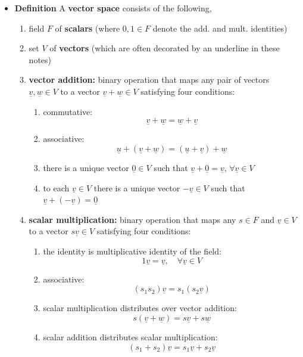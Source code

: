 \documentclass[11pt,twoside]{report}
\newcommand{\vecnot}{\underline}
\begin{document}
\begin{itemize}
\item \textbf{Definition}  A \textbf{vector space} consists of the following,
\begin{enumerate}
\item field $F$ of \textbf{scalars} (where $0,1 \in F$ denote the add. and mult. identities)
\item  set $V$ of \textbf{vectors} (which are often decorated by an underline in these notes)
\item \textbf{vector addition:} binary operation that maps any pair of vectors $\vecnot{v}, \vecnot{w} \in V$ to a vector $\vecnot{v} + \vecnot{w} \in V$ satisfying four conditions:
\begin{enumerate}
\item commutative: 
\[
\vecnot{v} + \vecnot{w} = \vecnot{w} + \vecnot{v}
\]
\item associative: \[
\vecnot{u} + (\vecnot{v} + \vecnot{w}) = (\vecnot{u} + \vecnot{v}) + \vecnot{w}
\]
\item there is a unique vector $\vecnot{0} \in V$ such that $\vecnot{v} + \vecnot{0} = \vecnot{v}$, $\forall \vecnot{v} \in V$
\item to each $\vecnot{v} \in V$ there is a unique vector $- \vecnot{v} \in V$ such that $\vecnot{v} + (- \vecnot{v}) = \vecnot{0}$
\end{enumerate}
\item \textbf{scalar multiplication:} binary operation that maps any $s \in F$ and $\vecnot{v} \in V$ to a vector $s \vecnot{v} \in V$ satisfying four conditions:
\begin{enumerate}
\item the identity is multiplicative identity of the field: 
\[
1 \vecnot{v} = \vecnot{v}, \quad \forall \vecnot{v} \in V
\]
\item  associative: 
\[
(s_1 s_2) \vecnot{v} = s_1 ( s_2 \vecnot{v} )
\]
\item scalar multiplication distributes over vector addition: 
\[
s ( \vecnot{v} + \vecnot{w} ) = s \vecnot{v} + s \vecnot{w}
\]
\item scalar addition distributes scalar multiplication: 
\[
(s_1 + s_2) \vecnot{v} = s_1 \vecnot{v} + s_2 \vecnot{v}
\]
\end{enumerate}
\end{enumerate}


\end{itemize}
\end{document}
